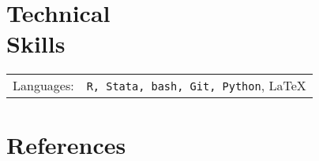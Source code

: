 \documentclass[margin,line,pifont,palatino,courier]{res}
\begin{document}
\begin{resume}


\section{\sc Technical \\ Skills}

\begin{tabular}{@{}p{0.8in}p{6in}}

Languages:& \verb+R, Stata, bash, Git, Python+, \LaTeX   \\

\end{tabular}









\section{\sc References}


\end{resume}
\end{document}
